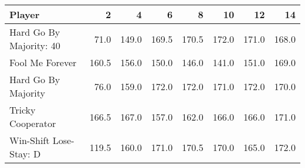 \begin{tabular}{lrrrrrrr}
\toprule
                  Player &      2 &      4 &      6 &      8 &     10 &     12 &     14 \\
\midrule
 Hard Go By Majority: 40 &   71.0 &  149.0 &  169.5 &  170.5 &  172.0 &  171.0 &  168.0 \\
         Fool Me Forever &  160.5 &  156.0 &  150.0 &  146.0 &  141.0 &  151.0 &  169.0 \\
     Hard Go By Majority &   76.0 &  159.0 &  172.0 &  172.0 &  171.0 &  172.0 &  170.0 \\
       Tricky Cooperator &  166.5 &  167.0 &  157.0 &  162.0 &  166.0 &  166.0 &  171.0 \\
  Win-Shift Lose-Stay: D &  119.5 &  160.0 &  171.0 &  170.5 &  170.0 &  165.0 &  172.0 \\
\bottomrule
\end{tabular}
